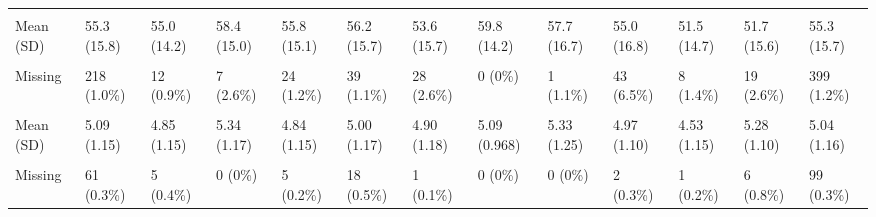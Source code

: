 \documentclass[
  single column]{article}
\begin{document}
\begin{landscape}
\begin{longtable}[t]{lllllllllllll}
\cellcolor{gray!10}{nzsei\_13\_l} & \cellcolor{gray!10}{} & \cellcolor{gray!10}{} & \cellcolor{gray!10}{} & \cellcolor{gray!10}{} & \cellcolor{gray!10}{} & \cellcolor{gray!10}{} & \cellcolor{gray!10}{} & \cellcolor{gray!10}{} & \cellcolor{gray!10}{} & \cellcolor{gray!10}{} & \cellcolor{gray!10}{} & \cellcolor{gray!10}{}\\
Mean (SD) & 55.3 (15.8) & 55.0 (14.2) & 58.4 (15.0) & 55.8 (15.1) & 56.2 (15.7) & 53.6 (15.7) & 59.8 (14.2) & 57.7 (16.7) & 55.0 (16.8) & 51.5 (14.7) & 51.7 (15.6) & 55.3 (15.7)\\
\cellcolor{gray!10}{Median [Min, Max]} & \cellcolor{gray!10}{59.0 [10.0, 90.0]} & \cellcolor{gray!10}{56.0 [12.0, 90.0]} & \cellcolor{gray!10}{60.0 [18.0, 90.0]} & \cellcolor{gray!10}{59.0 [10.0, 90.0]} & \cellcolor{gray!10}{60.0 [10.0, 90.0]} & \cellcolor{gray!10}{52.0 [10.0, 90.0]} & \cellcolor{gray!10}{63.0 [24.0, 90.0]} & \cellcolor{gray!10}{62.5 [11.0, 90.0]} & \cellcolor{gray!10}{60.0 [11.0, 90.0]} & \cellcolor{gray!10}{48.0 [10.0, 90.0]} & \cellcolor{gray!10}{51.0 [11.0, 90.0]} & \cellcolor{gray!10}{59.0 [10.0, 90.0]}\\
Missing & 218 (1.0\%) & 12 (0.9\%) & 7 (2.6\%) & 24 (1.2\%) & 39 (1.1\%) & 28 (2.6\%) & 0 (0\%) & 1 (1.1\%) & 43 (6.5\%) & 8 (1.4\%) & 19 (2.6\%) & 399 (1.2\%)\\
\addlinespace
\cellcolor{gray!10}{openness} & \cellcolor{gray!10}{} & \cellcolor{gray!10}{} & \cellcolor{gray!10}{} & \cellcolor{gray!10}{} & \cellcolor{gray!10}{} & \cellcolor{gray!10}{} & \cellcolor{gray!10}{} & \cellcolor{gray!10}{} & \cellcolor{gray!10}{} & \cellcolor{gray!10}{} & \cellcolor{gray!10}{} & \cellcolor{gray!10}{}\\
Mean (SD) & 5.09 (1.15) & 4.85 (1.15) & 5.34 (1.17) & 4.84 (1.15) & 5.00 (1.17) & 4.90 (1.18) & 5.09 (0.968) & 5.33 (1.25) & 4.97 (1.10) & 4.53 (1.15) & 5.28 (1.10) & 5.04 (1.16)\\
\cellcolor{gray!10}{Median [Min, Max]} & \cellcolor{gray!10}{5.25 [1.00, 7.00]} & \cellcolor{gray!10}{4.75 [1.00, 7.00]} & \cellcolor{gray!10}{5.42 [1.50, 7.00]} & \cellcolor{gray!10}{5.00 [1.00, 7.00]} & \cellcolor{gray!10}{5.00 [1.00, 7.00]} & \cellcolor{gray!10}{5.00 [1.75, 7.00]} & \cellcolor{gray!10}{5.25 [2.75, 7.00]} & \cellcolor{gray!10}{5.50 [1.75, 7.00]} & \cellcolor{gray!10}{5.00 [1.25, 7.00]} & \cellcolor{gray!10}{4.50 [1.00, 7.00]} & \cellcolor{gray!10}{5.50 [1.25, 7.00]} & \cellcolor{gray!10}{5.00 [1.00, 7.00]}\\
Missing & 61 (0.3\%) & 5 (0.4\%) & 0 (0\%) & 5 (0.2\%) & 18 (0.5\%) & 1 (0.1\%) & 0 (0\%) & 0 (0\%) & 2 (0.3\%) & 1 (0.2\%) & 6 (0.8\%) & 99 (0.3\%)\\

\end{longtable}
\end{landscape}
\end{document}
